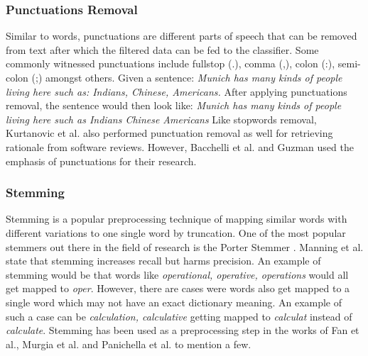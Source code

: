 \documentclass[a4paper,12pt,twoside]{report}
\begin{document}
\subsubsection{Punctuations Removal}
Similar to words, punctuations are different parts of speech that can be removed from text after which the filtered data can be fed to the classifier. Some commonly witnessed punctuations include fullstop (.), comma (,), colon (:), semi-colon (;) amongst others. 
\newline \newline
Given a sentence: \textit{Munich has many kinds of people living here such as: Indians, Chinese, Americans.}
\newline \newline
After applying punctuations removal, the sentence would then look like: \textit{Munich has many kinds of people living here such as Indians Chinese Americans}
\newline \newline
Like stopwords removal, Kurtanovic et al.\cite{Kurtanovic2017} also performed punctuation removal as well for retrieving rationale from software reviews. However, Bacchelli et al.\cite{Bacchelli2012} and Guzman\cite{Guzman2015} used the emphasis of punctuations for their research. 

\subsubsection{Stemming}
Stemming is a popular preprocessing technique of mapping similar words with different variations to one single word by truncation. One of the most popular stemmers out there in the field of research is the Porter Stemmer \cite{Porter}. Manning et al.\cite{Manning2009} state that stemming increases recall but harms precision. An example of stemming would be that words like \textit{operational, operative, operations} would all get mapped to \textit{oper}. However, there are cases were words also get mapped to a single word which may not have an exact dictionary meaning. An example of such a case can be \textit{calculation, calculative} getting mapped to \textit{calculat} instead of \textit{calculate}\cite{Toman2006}. Stemming has been used as a preprocessing step in the works of Fan et al.\cite{Fan2017}, Murgia et al.\cite{Murgia2016} and Panichella et al.\cite{Panichella2014} to mention a few.
\end{document}
